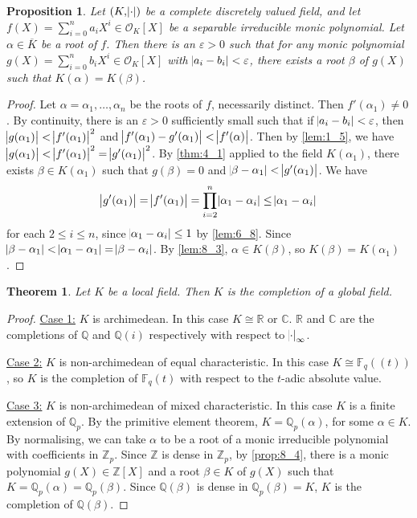 \documentclass[11pt]{article}
\theoremstyle{definition}
\theoremstyle{plain}
\newtheorem{theorem}[definition]{Theorem}
\newtheorem{proposition}[definition]{Proposition}
\theoremstyle{remark}
\newcommand{\FF}{\mathbb{F}}
\newcommand{\ZZ}{\mathbb{Z}}
\newcommand{\QQ}{\mathbb{Q}}
\newcommand{\RR}{\mathbb{R}}
\newcommand{\CC}{\mathbb{C}}
\newcommand{\cO}{\mathcal{O}}
\begin{document}
\begin{proposition}\label{prop:8_4}
    Let $(K, \abs{\cdot})$ be a complete discretely valued field, and let $f(X) = \sum_{i=0}^n a_i X^i \in \cO_K[X]$ be a separable irreducible monic polynomial. Let $\alpha \in \overline{K}$ be a root of $f$. Then there is an $\varepsilon > 0$ such that for any monic polynomial $g(X) = \sum_{i=0}^n b_i X^i \in \cO_K[X]$ with $\abs{a_i - b_i} < \varepsilon$, there exists a root $\beta$ of $g(X)$ such that $K(\alpha) = K(\beta)$.
\end{proposition}
\begin{proof}
    Let $\alpha = \alpha_1, \ldots, \alpha_n$ be the roots of $f$, necessarily distinct. Then $f'(\alpha_1) \neq 0$. By continuity, there is an $\varepsilon > 0$ sufficiently small such that if $\abs{a_i - b_i} < \varepsilon$, then $\abs{g(\alpha_1)} < \abs{f'(\alpha_1)}^2$ and $\abs{f'(\alpha_1) - g'(\alpha_1)} < \abs{f'(\alpha)}$. Then by \autoref{lem:1_5}, we have $\abs{g(\alpha_1)} < \abs{f'(\alpha_1)}^2 = \abs{g'(\alpha_1)}^2$. By \autoref{thm:4_1} applied to the field $K(\alpha_1)$, there exists $\beta \in K(\alpha_1)$ such that $g(\beta) = 0$ and $\abs{\beta - \alpha_1} < \abs{g'(\alpha_1)}$. We have
    \begin{equation*}
        \abs{g'(\alpha_1)} = \abs{f'(\alpha_1)} = \prod_{i=2}^n \abs{\alpha_1 - \alpha_i} \le \abs{\alpha_1 - \alpha_i}
    \end{equation*}
    for each $2 \le i \le n$, since $\abs{\alpha_1 - \alpha_i} \le 1$ by \autoref{lem:6_8}. Since $\abs{\beta - \alpha_1} < \abs{\alpha_1 - \alpha_1} = \abs{\beta - \alpha_i}$. By \autoref{lem:8_3}, $\alpha \in K(\beta)$, so $K(\beta) = K(\alpha_1)$.
\end{proof}

\begin{theorem}\label{thm:8_5}
    Let $K$ be a local field. Then $K$ is the completion of a global field.
\end{theorem}
\begin{proof}
    \underline{Case 1:} $K$ is archimedean. In this case $K \cong \RR$ or $\CC$. $\RR$ and $\CC$ are the completions of $\QQ$ and $\QQ(i)$ respectively with respect to $\abs{\cdot}_\infty$.

    \underline{Case 2:} $K$ is non-archimedean of equal characteristic. In this case $K \cong \FF_q((t))$, so $K$ is the completion of $\FF_q(t)$ with respect to the $t$-adic absolute value.

    \underline{Case 3:} $K$ is non-archimedean of mixed characteristic. In this case $K$ is a finite extension of $\QQ_p$. By the primitive element theorem, $K = \QQ_p(\alpha)$, for some $\alpha \in K$. By normalising, we can take $\alpha$ to be a root of a monic irreducible polynomial with coefficients in $\ZZ_p$. Since $\ZZ$ is dense in $\ZZ_p$, by \autoref{prop:8_4}, there is a monic polynomial $g(X) \in \ZZ[X]$ and a root $\beta \in K$ of $g(X)$ such that $K = \QQ_p(\alpha) = \QQ_p(\beta)$. Since $\QQ(\beta)$ is dense in $\QQ_p(\beta) = K$, $K$ is the completion of $\QQ(\beta)$.
\end{proof}
\end{document}
